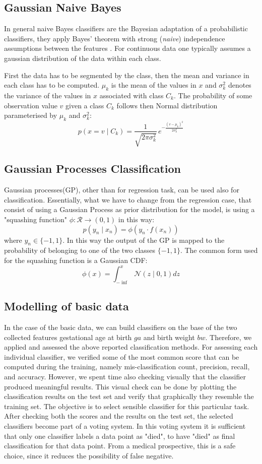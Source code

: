 \documentclass[a4paper,11pt]{article}
\begin{document}
\subsection*{Gaussian Naive Bayes}

In general naive Bayes classifiers are the Bayesian adaptation of a probabilistic classifiers, they apply Bayes' theorem with strong (\textit{naive}) independence assumptions between the features \cite{10.2307/1403452}.
For continuous data one typically assumes a gaussian distribution of the data within each class.

First the data has to be segmented by the class, then the mean and variance in each class has to be computed. $ \mu _{k}$ is the mean of the values in $x$ and  $ \sigma _{k}^{2}$ denotes the variance of the values in $x$ associated with class $C_k$.
The probability of some observation value $v$ given a class $C_{k}$ follows then Normal distribution parameterised by $\mu _{k}$ and $\sigma _{k}^{2}$:
$$  p(x=v\mid C_{k})={\frac {1}{\sqrt {2\pi \sigma _{k}^{2}}}}\,e^{-{\frac {(v-\mu _{k})^{2}}{2\sigma _{k}^{2}}}} $$

\subsection{Gaussian Processes Classification}
Gaussian processes(GP), other than for regression task, can be used also for classification\cite{MacKay:2002:ITI:971143}. Essentially, what we have to change from the regression case, that consist of using a Gaussian Process as prior distribution for the model, is using a "squashing function" $\phi:\mathcal{R}\rightarrow(0,1)$ in this way:
\[ p(y_n\mid x_n) = \phi(y_n\cdot f(x_n)) \]
where $y_n\in\{-1,1\}$. In this way the output of the GP is mapped to the probability of belonging to one of the two classes $\{-1,1\}$. The common form used for the squashing function is a Gaussian CDF:
\[ \phi(x) = \int_{-\inf}^x \mathcal{N}(z\mid 0,1)dz \]

\subsection{Modelling of basic data}
In the case of the basic data, we can build classifiers on the base of the two collected features gestational age at birth $ga$ and birth weight $bw$. Therefore, we applied and assessed the above reported classification methods. For assessing each individual classifier, we verified some of the most common score that can be computed during the training, namely mis-classification count, precision, recall, and accuracy. However, we spent time also checking visually that the classifier produced meaningful results. This visual check can be done by plotting the classification results on the test set and verify that graphically they resemble the training set. The objective is to select sensible classifier for this particular task. After checking both the scores and the results on the test set, the selected classifiers become part of a voting system. In this voting system it is sufficient that only one classifier labels a data point as "died", to have "died" as final classification for that data point. From a medical prospective, this is a safe choice, since it reduces the possibility of false negative.
\end{document}
